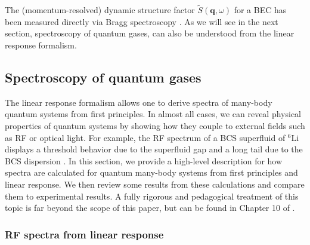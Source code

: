 \documentclass[prl,
twocolumn,
nofootinbib,
amsmath,amssymb,
aps]{revtex4-1}
\begin{document}
The (momentum-resolved) dynamic structure factor $\widetilde{S}(\mathbf{q},\omega)$ for a BEC has been measured directly via Bragg spectroscopy \cite{stenger1999bragg}. As we will see in the next section, spectroscopy of quantum gases, can also be understood from the linear response formalism. 




\subsection{Spectroscopy of quantum gases}\label{sec:spec}

The linear response formalism allows one to derive spectra of many-body quantum systems from first principles. In almost all cases, we can reveal physical properties of quantum systems by showing how they couple to external fields such as RF or optical light. For example, the RF spectrum of a BCS superfluid of $^6$Li displays a threshold behavior due to the superfluid gap and a long tail due to the BCS dispersion \cite{schirotzek2008determination, torma2014quantum}. In this section, we provide a high-level description for how spectra are calculated for quantum many-body systems from first principles and linear response. We then review some results from these calculations and compare them to experimental results. A fully rigorous and pedagogical treatment of this topic is far beyond the scope of this paper, but can be found in Chapter 10 of \cite{torma2014quantum}. 
 
\subsubsection{RF spectra from linear response}\label{sec:method}
\end{document}
